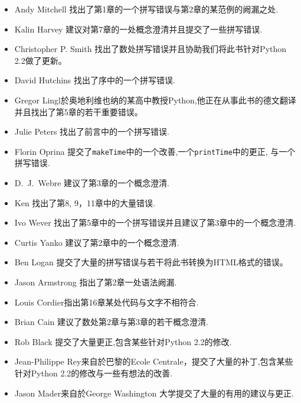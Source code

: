 \begin{itemize}
\item Andy Mitchell 找出了第1章的一个拼写错误与第2章的某范例的阙漏之处.

\item Kalin Harvey 建议对第7章的一处概念澄清并且提交了一些拼写错误.

\item Christopher P. Smith 找出了数处拼写错误并且协助我们将此书针对Python 2.2做了更新。

\item David Hutchins 找出了序中的一个拼写错误.

\item Gregor Lingl於奥地利维也纳的某高中教授Python,他正在从事此书的德文翻译并且找出了第5章的若干重要错误。

\item Julie Peters 找出了前言中的一个拼写错误.

\item Florin Oprina 提交了{\tt makeTime}中的一个改善,一个{\tt printTime}中的更正, 与一个拼写错误.

\item D.~J.~Webre 建议了第3章的一个概念澄清.

\item Ken 找出了第8, 9，11章中的大量错误.

\item Ivo Wever 找出了第5章中的一个拼写错误并且建议了第3章中的一个概念澄清.

\item Curtis Yanko 建议了第2章中的一个概念澄清.

\item Ben Logan 提交了大量的拼写错误与若干将此书转换为HTML格式的错误。

\item Jason Armstrong 指出了第2章一处语法阙漏.

\item Louis Cordier指出第16章某处代码与文字不相符合.

\item Brian Cain 建议了数处第2章与第3章的若干概念澄清.

\item Rob Black 提交了大量更正,包含某些针对Python 2.2的修改.

\item Jean-Philippe Rey来自於巴黎的Ecole Centrale，提交了大量的补丁,包含某些针对Python 2.2的修改与一些有想法的改善.

\item Jason Mader来自於George Washington 大学提交了大量的有用的建议与更正.


\end{itemize}

